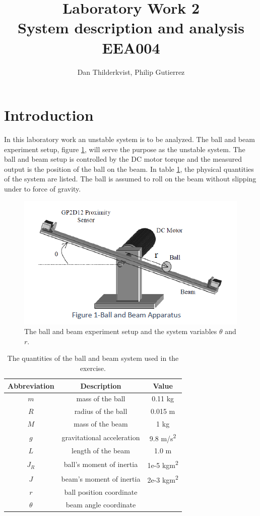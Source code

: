 \documentclass[a4paper, titlepage]{article}
\title{Laboratory Work 2\\
System description and analysis\\
\large EEA004}
\author{Dan Thilderkvist, Philip Gutierrez}
\begin{document}
\maketitle

\section{Introduction}
In this laboratory work an unstable system is to be analyzed.
The ball and beam experiment setup, figure \ref{fig:ballAndBeam}, will serve the purpose as the unstable system.
The ball and beam setup is controlled by the DC motor torque and the measured output is the position of the ball on the beam.
In table \ref{tab:quantities}, the physical quantities of the system are listed.
The ball is assumed to roll on the beam without slipping under to force of gravity.

\begin{figure}[h!]
\center
\includegraphics[scale=0.8]{../figures/ballAndBeam.png}
\caption{The ball and beam experiment setup and the system variables $\theta$ and $r$.}
\label{fig:ballAndBeam}
\end{figure}

\begin{table}[h!]
\centering
 \begin{tabular}{||c c c||} 
 \hline
 Abbreviation & Description & Value \\ [0.5ex] 
 \hline\hline
 $m$ & mass of the ball & 0.11 kg \\ 
 $R$ & radius of the ball & 0.015 m \\
 $M$ & mass of the beam & 1 kg \\
 $g$ & gravitational acceleration & 9.8 m/s\textsuperscript{2} \\
 $L$ & length of the beam & 1.0 m \\
 $J_R$ & ball's moment of inertia & 1e-5 kgm\textsuperscript{2} \\
 $J$ & beam's moment of inertia & 2e-3 kgm\textsuperscript{2} \\
 $r$ & ball position coordinate & \\
 $\theta$ & beam angle coordinate &  \\ [1ex] 
 \hline
 \end{tabular}
 \caption{The quantities of the ball and beam system used in the exercise.}
 \label{tab:quantities}
\end{table}
\end{document}
